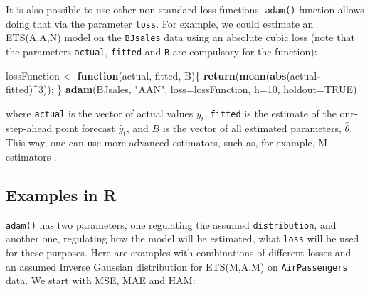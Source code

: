 \documentclass[]{book}
\newenvironment{Shaded}{\begin{snugshade}}{\end{snugshade}}
\newcommand{\ControlFlowTok}[1]{\textcolor[rgb]{0.13,0.29,0.53}{\textbf{#1}}}
\newcommand{\DataTypeTok}[1]{\textcolor[rgb]{0.13,0.29,0.53}{#1}}
\newcommand{\DecValTok}[1]{\textcolor[rgb]{0.00,0.00,0.81}{#1}}
\newcommand{\KeywordTok}[1]{\textcolor[rgb]{0.13,0.29,0.53}{\textbf{#1}}}
\newcommand{\NormalTok}[1]{#1}
\newcommand{\OperatorTok}[1]{\textcolor[rgb]{0.81,0.36,0.00}{\textbf{#1}}}
\newcommand{\OtherTok}[1]{\textcolor[rgb]{0.56,0.35,0.01}{#1}}
\newcommand{\StringTok}[1]{\textcolor[rgb]{0.31,0.60,0.02}{#1}}
\theoremstyle{definition}
\theoremstyle{definition}
\theoremstyle{definition}
\theoremstyle{definition}
\theoremstyle{remark}
\begin{document}
It is also possible to use other non-standard loss functions. \texttt{adam()} function allows doing that via the parameter \texttt{loss}. For example, we could estimate an ETS(A,A,N) model on the \texttt{BJsales} data using an absolute cubic loss (note that the parameters \texttt{actual}, \texttt{fitted} and \texttt{B} are compulsory for the function):

\begin{Shaded}
\begin{Highlighting}[]
\NormalTok{lossFunction <-}\StringTok{ }\ControlFlowTok{function}\NormalTok{(actual, fitted, B)\{}
    \KeywordTok{return}\NormalTok{(}\KeywordTok{mean}\NormalTok{(}\KeywordTok{abs}\NormalTok{(actual}\OperatorTok{-}\NormalTok{fitted)}\OperatorTok{^}\DecValTok{3}\NormalTok{));}
\NormalTok{\}}
\KeywordTok{adam}\NormalTok{(BJsales, }\StringTok{"AAN"}\NormalTok{, }\DataTypeTok{loss=}\NormalTok{lossFunction, }\DataTypeTok{h=}\DecValTok{10}\NormalTok{, }\DataTypeTok{holdout=}\OtherTok{TRUE}\NormalTok{)}
\end{Highlighting}
\end{Shaded}

where \texttt{actual} is the vector of actual values \(y_t\), \texttt{fitted} is the estimate of the one-step-ahead point forecast \(\hat{y}_t\), and \(B\) is the vector of all estimated parameters, \(\hat{\theta}\). This way, one can use more advanced estimators, such as, for example, M-estimators \citep{Barrow2020}.

\hypertarget{examples-in-r}{%
\subsection{Examples in R}\label{examples-in-r}}

\texttt{adam()} has two parameters, one regulating the assumed \texttt{distribution}, and another one, regulating how the model will be estimated, what \texttt{loss} will be used for these purposes. Here are examples with combinations of different losses and an assumed Inverse Gaussian distribution for ETS(M,A,M) on \texttt{AirPassengers} data. We start with MSE, MAE and HAM:
\end{document}
